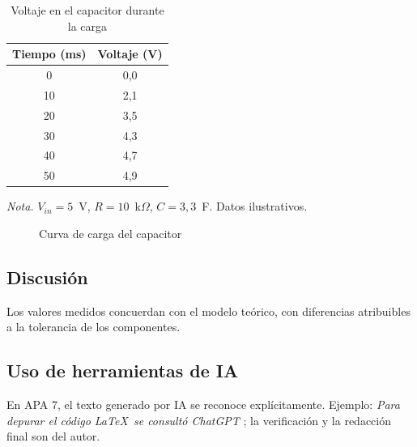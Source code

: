 \documentclass[stu,12pt,a4paper,floatsintext]{apa7}
\begin{document}
\begin{table}[htbp]
  \caption{Voltaje en el capacitor durante la carga}
  \label{tab:carga}
  \centering
  \begin{threeparttable}
  \begin{tabular}{cc}
    \toprule
    Tiempo (ms) & Voltaje (V) \\
    \midrule
    0  & 0{,}0 \\
    10 & 2{,}1 \\
    20 & 3{,}5 \\
    30 & 4{,}3 \\
    40 & 4{,}7 \\
    50 & 4{,}9 \\
    \bottomrule
  \end{tabular}
  \begin{tablenotes}[para]
    \item \textit{Nota.} $V_{in} = 5$~V, $R = 10$~k$\Omega$, $C = 3{,}3$~\textmu F.
    Datos ilustrativos.
  \end{tablenotes}
  \end{threeparttable}
\end{table}

\begin{figure}[htbp]
  \caption{Curva de carga del capacitor}
  \label{fig:carga}
  \centering
\end{figure}

\subsection{Discusión}
Los valores medidos concuerdan con el modelo teórico, con diferencias
atribuibles a la tolerancia de los componentes.

\subsection{Uso de herramientas de IA}
En APA 7, el texto generado por IA se reconoce explícitamente. Ejemplo:
\emph{Para depurar el código \LaTeX\ se consultó ChatGPT}
\parencite{openai_chatgpt}; la verificación y la redacción final son del autor.

\printbibliography[title={Referencias}]
\end{document}
